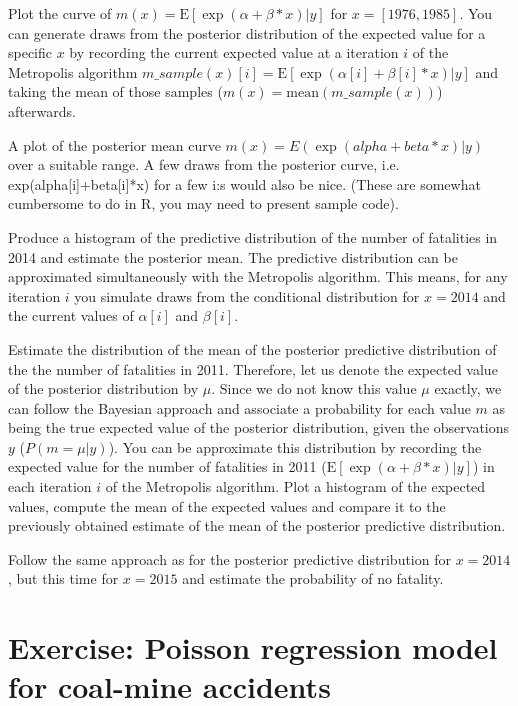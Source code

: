 \documentclass[11pt]{article}
\begin{document}
Plot the curve of $m(x) = \text{E}[\exp(\alpha+\beta*x)|y]$ for $x = [1976,1985]$. 
You can generate draws from the posterior distribution of the expected value for a specific $x$ by recording the current expected value at a iteration $i$ of the Metropolis algorithm $m\_sample(x)[i] = \text{E}[\exp(\alpha[i]+\beta[i]*x)|y]$ and taking the mean of those samples ($m(x) = \text{mean}(m\_sample(x))$) afterwards.
 
A plot of the posterior mean curve $m(x)=E(\exp(alpha+beta*x)|y)$ over a suitable range. 
A few draws from the posterior curve, i.e. exp(alpha[i]+beta[i]*x) for a few i:s would also be nice.
(These are somewhat cumbersome to do in R, you may need to present sample code).

 
Produce a histogram of the predictive distribution of the number of fatalities in 2014 and estimate the posterior mean. 
The predictive distribution can be approximated simultaneously with the Metropolis algorithm. 
This means, for any iteration $i$ you simulate draws from the conditional distribution for $x = 2014$ and the current values of $\alpha[i]$ and $\beta[i]$.
 
Estimate the distribution of the mean of the posterior predictive distribution of the the number of fatalities in 2011. 
Therefore, let us denote the expected value of the posterior distribution by $\mu$. 
Since we do not know this value $\mu$ exactly, we can follow the Bayesian approach and associate a probability for each value $m$ as being the true expected value of the posterior distribution, given the observations $y$ ($P(m = \mu|y)$).
You can be approximate this distribution by recording the expected value for the number of fatalities in 2011 ($\text{E}[\exp(\alpha+\beta*x)|y]$) in each iteration $i$ of the Metropolis algorithm. 
Plot a histogram of the expected values, compute the mean of the expected values and compare it to the previously obtained estimate of the mean of the posterior predictive distribution.
 
Follow the same approach as for the posterior predictive distribution for $x = 2014$, but this time for $x = 2015$ and estimate the probability of no fatality. 
 
 
 
 

\newpage
\FloatBarrier
\section{Exercise: Poisson regression model for coal-mine accidents}
 
\end{document}
